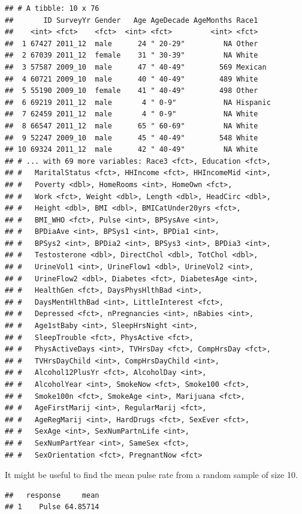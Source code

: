 \documentclass[
]{book}
\begin{document}
\begin{verbatim}
## # A tibble: 10 x 76
##       ID SurveyYr Gender   Age AgeDecade AgeMonths Race1   
##    <int> <fct>    <fct>  <int> <fct>         <int> <fct>   
##  1 67427 2011_12  male      24 " 20-29"         NA Other   
##  2 67039 2011_12  female    31 " 30-39"         NA White   
##  3 57587 2009_10  male      47 " 40-49"        569 Mexican 
##  4 60721 2009_10  male      40 " 40-49"        489 White   
##  5 55190 2009_10  female    41 " 40-49"        498 Other   
##  6 69219 2011_12  male       4 " 0-9"           NA Hispanic
##  7 62459 2011_12  male       4 " 0-9"           NA White   
##  8 66547 2011_12  male      65 " 60-69"         NA White   
##  9 52247 2009_10  male      45 " 40-49"        548 White   
## 10 69324 2011_12  male      42 " 40-49"         NA White   
## # ... with 69 more variables: Race3 <fct>, Education <fct>,
## #   MaritalStatus <fct>, HHIncome <fct>, HHIncomeMid <int>,
## #   Poverty <dbl>, HomeRooms <int>, HomeOwn <fct>,
## #   Work <fct>, Weight <dbl>, Length <dbl>, HeadCirc <dbl>,
## #   Height <dbl>, BMI <dbl>, BMICatUnder20yrs <fct>,
## #   BMI_WHO <fct>, Pulse <int>, BPSysAve <int>,
## #   BPDiaAve <int>, BPSys1 <int>, BPDia1 <int>,
## #   BPSys2 <int>, BPDia2 <int>, BPSys3 <int>, BPDia3 <int>,
## #   Testosterone <dbl>, DirectChol <dbl>, TotChol <dbl>,
## #   UrineVol1 <int>, UrineFlow1 <dbl>, UrineVol2 <int>,
## #   UrineFlow2 <dbl>, Diabetes <fct>, DiabetesAge <int>,
## #   HealthGen <fct>, DaysPhysHlthBad <int>,
## #   DaysMentHlthBad <int>, LittleInterest <fct>,
## #   Depressed <fct>, nPregnancies <int>, nBabies <int>,
## #   Age1stBaby <int>, SleepHrsNight <int>,
## #   SleepTrouble <fct>, PhysActive <fct>,
## #   PhysActiveDays <int>, TVHrsDay <fct>, CompHrsDay <fct>,
## #   TVHrsDayChild <int>, CompHrsDayChild <int>,
## #   Alcohol12PlusYr <fct>, AlcoholDay <int>,
## #   AlcoholYear <int>, SmokeNow <fct>, Smoke100 <fct>,
## #   Smoke100n <fct>, SmokeAge <int>, Marijuana <fct>,
## #   AgeFirstMarij <int>, RegularMarij <fct>,
## #   AgeRegMarij <int>, HardDrugs <fct>, SexEver <fct>,
## #   SexAge <int>, SexNumPartnLife <int>,
## #   SexNumPartYear <int>, SameSex <fct>,
## #   SexOrientation <fct>, PregnantNow <fct>
\end{verbatim}

It might be useful to find the mean pulse rate from a random sample of size 10.

\begin{verbatim}
##   response     mean
## 1    Pulse 64.85714
\end{verbatim}
\end{document}
